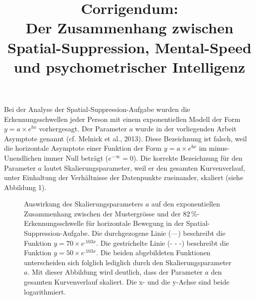 \documentclass[11pt,a4paper]{article}
\date{}
\title{\textbf{Corrigendum}:\\Der Zusammenhang zwischen Spatial-Suppression, Mental-Speed und psychometrischer Intelligenz}
\begin{document}
	\maketitle
	\thispagestyle{empty}

	\noindent Bei der Analyse der Spatial-Suppression-Aufgabe wurden die Erkennungsschwellen jeder Person mit einem exponentiellen Modell der Form $y=a \times e^{bx}$ vorhergesagt. Der Parameter $a$ wurde in der vorliegenden Arbeit Asymptote genannt (cf. Melnick et al., 2013).
	Diese Bezeichnung ist falsch, weil die horizontale Asymptote einer Funktion der Form $y=a \times e^{bx}$ im minus-Unendlichen immer Null beträgt ($e^{-\infty}=0$). Die korrekte Bezeichnung für den Parameter $a$ lautet Skalierungsparameter, weil er den gesamten Kurvenverlauf, unter Einhaltung der Verhältnisse der Datenpunkte zueinander, skaliert (siehe Abbildung 1).
	
	\begin{figure}[h]
		\centering
		\begin{adjustbox}{width=.91\textwidth}
			
		\end{adjustbox}
		\caption[]{Auswirkung des Skalierungsparameters $a$ auf den exponentiellen Zusammenhang zwischen der Mustergrösse und der $82\,\%$-Er\-ken\-nungs\-schwel\-le für horizontale Bewegung in der Spatial-Suppression-Aufgabe. Die durchgezogene Linie (---) beschreibt die Funktion $y=70 \times e^{.103x}$. Die gestrichelte Linie (- - -) beschreibt die Funktion $y=50 \times e^{.103x}$. Die beiden abgebildeten Funktionen unterscheiden sich folglich lediglich durch den Skalierungsparameter $a$. Mit dieser Abbildung wird deutlich, dass der Parameter $a$ den gesamten Kurvenverlauf skaliert. Die x- und die y-Achse sind beide logarithmiert.}
		\label{fig:scale}
	\end{figure}
\end{document}
